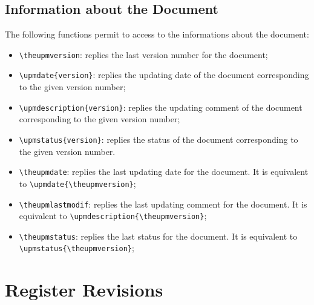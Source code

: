 \documentclass[book]{upmethodology-document}
\begin{document}
\subsection{Information about the Document}

The following functions permit to access to the informations about the document:
\begin{itemize}
\item \texttt{{\textbackslash}theupmversion}: replies the last version number for the document;

\item \texttt{{\textbackslash}upmdate\{version\}}: replies the updating date of the document corresponding to the given version number;

\item \texttt{{\textbackslash}upmdescription\{version\}}: replies the updating comment of the document corresponding to the given version number;

\item \texttt{{\textbackslash}upmstatus\{version\}}: replies the status of the document corresponding to the given version number.

\item \texttt{{\textbackslash}theupmdate}: replies the last updating date for the document. It is equivalent to \texttt{{\textbackslash}upmdate\{{\textbackslash}theupmversion\}};

\item \texttt{{\textbackslash}theupmlastmodif}: replies the last updating comment for the document. It is equivalent to \texttt{{\textbackslash}upmdescription\{{\textbackslash}theupmversion\}};

\item \texttt{{\textbackslash}theupmstatus}: replies the last status for the document. It is equivalent to \texttt{{\textbackslash}upmstatus\{{\textbackslash}theupmversion\}};
\end{itemize}

\section{Register Revisions}
\end{document}
